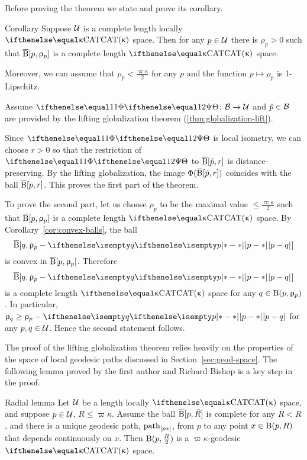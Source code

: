 Before proving the theorem we state and prove its corollary.

\begin{thm}{Corollary}\label{cor:loc-CAT(k)}
Suppose $\mathcal{U}$ is a complete length locally $\CAT\kappa$ space.
Then for any $p\in\spc{U}$ there is $\rho_p>0$
such that $\overline{\mathrm{B}}{}[p,\upvarrho_p]$ is a complete length $\CAT\kappa$ space.

Moreover, we can assume that $\rho_p<\tfrac{\varpi\kappa}2$
for any $p$ and the function $p\mapsto\rho_p$ is 1-Lipschitz.
\end{thm}

Assume $\map\:\spc{B}\to \spc{U}$ 
and $\hat p\in \spc{B}$
are provided by the lifting globalization theorem
(\ref{thm:globalization-lift}).

Since $\map$ is local isometry,
we can choose $r>0$ so that the restriction of $\map$ to $\overline{\mathrm{B}}{}[\hat p,r]$ is distance-preserving.
By the lifting globalization, the image  $\Phi(\overline{\mathrm{B}}{}[\hat p,r])$ coincides with the ball
$\overline{\mathrm{B}}{}[p,r]$.
This proves the first part of the theorem.

To prove the second part, let us choose $\rho_p$ to be the maximal value $\le\tfrac{\varpi\kappa}2$ such that $\overline{\mathrm{B}}{}[p,\upvarrho_p]$ is a complete length $\CAT\kappa$ space.
By Corollary~\ref{cor:convex-balls}, the ball
\[\cBall[q,\rho_p-\dist{p}{q}{}]\] 
is convex in $\overline{\mathrm{B}}{}[p,\upvarrho_p]$.
Therefore  
\[\cBall[q,\rho_p-\dist{p}{q}{}]\] is a complete length $\CAT\kappa$ space
for any $q\in \oBall(p,\rho_p)$.
In particular, $\rho_q\ge \rho_p-\dist{p}{q}{}$ for any $p,q\in\spc{U}$.
Hence the second statement follows.
\qeds




The proof of the lifting globalization theorem relies heavily on the properties of the space of local geodesic paths discussed in Section~\ref{sec:geod-space}.
The following lemma proved by the first author and Richard Bishop \cite{alexander-bishop:cbc} 
is a key step in the proof.

\begin{thm}{Radial lemma}\label{lem:radial-glob}
Let $\mathcal{U}$ be a length locally $\CAT\kappa$ space,
and suppose $p\in\spc{U}$, $R\le\varpi\kappa$.
Assume the ball  $\overline{\mathrm{B}}{}[p,\bar{R}]$ is complete for any $\bar{R}<R$, and  there is a unique geodesic path, $\mathrm{path}_{[p x]}$, from $p$ to any point $x\in\oBall(p,R)$ 
that depends continuously on $x$.
Then $\mathrm{B}{}(p,\tfrac R2)$ is a $\varpi\kappa$-geodesic $\CAT\kappa$ space.
\end{thm}
 
